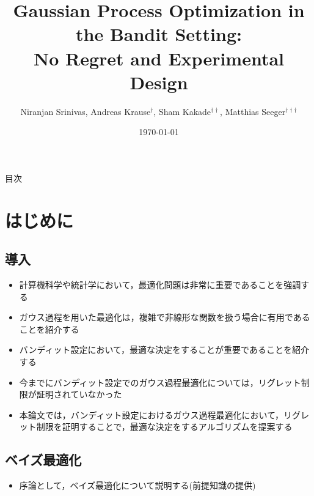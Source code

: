 \documentclass[dvipdfmx, 10.5pt]{beamer}
\title[]{Gaussian Process Optimization in the Bandit Setting:\\No Regret and Experimental Design}
\subtitle{}
\author[]{Niranjan Srinivas, Andreas Krause$^{\dag}$, Sham Kakade$^{\dag\dag}$, Matthias Seeger$^{\dag\dag\dag}$}
\date[\today]{\today}
\institute[]{$\dag$: California Institute of Technology\\
$\dag\dag$: University of Pennsylvania\\
$\dag\dag\dag$: Saarland University}
\begin{document}

\begin{frame}
\maketitle%
\thispagestyle{empty}%
\end{frame}



\begin{frame}[noframenumbering]{目次}
	\tableofcontents[hideallsubsections]
	\thispagestyle{empty} %
\end{frame}

\section{はじめに}

\subsection{導入}

\begin{frame}{\insertsubsection}
	\begin{itemize}
		\item 計算機科学や統計学において，最適化問題は非常に重要であることを強調する
		\item ガウス過程を用いた最適化は，複雑で非線形な関数を扱う場合に有用であることを紹介する
		\item バンディット設定において，最適な決定をすることが重要であることを紹介する
		\item 今までにバンディット設定でのガウス過程最適化については，リグレット制限が証明されていなかった
		\item 本論文では，バンディット設定におけるガウス過程最適化において，リグレット制限を証明することで，最適な決定をするアルゴリズムを提案する
	\end{itemize}

\end{frame}

\subsection{ベイズ最適化}
\begin{frame}{\insertsubsection}
	\begin{itemize}
		\item 序論として，ベイズ最適化について説明する(前提知識の提供)
	\end{itemize}

\end{frame}
\end{document}
